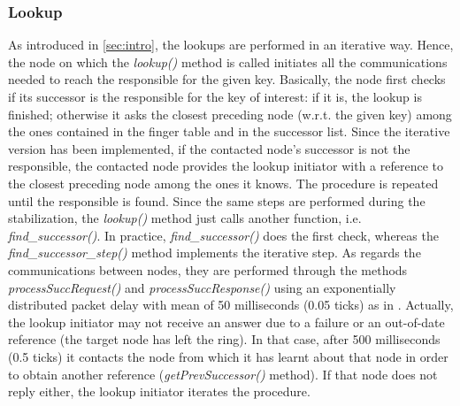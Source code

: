 \documentclass[11pt,twocolumn,letterpaper]{article}
\begin{document}
	\subsubsection{Lookup}
	\label{subsubsec:lookup}
	As introduced in \cref{sec:intro}, the lookups are performed in an iterative way. Hence, the node on which the \textit{lookup()} method is called initiates all the communications needed to reach the responsible for the given key. \newline
	Basically, the node first checks if its successor is the responsible for the key of interest: if it is, the lookup is finished; otherwise it asks the closest preceding node (w.r.t. the given key) among the ones contained in the finger table and in the successor list. Since the iterative version has been implemented, if the contacted node's successor is not the responsible, the contacted node provides the lookup initiator with a reference to the closest preceding node among the ones it knows. The procedure is repeated until the responsible is found. \newline
	Since the same steps are performed during the stabilization, the \textit{lookup()} method just calls another function, i.e. \textit{find\_successor()}. In practice, \textit{find\_successor()} does the first check, whereas the \textit{find\_successor\_step()} method implements the iterative step. As regards the communications between nodes, they are performed through the methods \textit{processSuccRequest()} and \textit{processSuccResponse()} using an exponentially distributed packet delay with mean of 50 milliseconds (0.05 ticks) as in \cite{chord}. \newline
	Actually, the lookup initiator may not receive an answer due to a failure or an out-of-date reference (the target node has left the ring). In that case, after 500 milliseconds (0.5 ticks) it contacts the node from which it has learnt about that node in order to obtain another reference (\textit{getPrevSuccessor()} method). If that node does not reply either, the lookup initiator iterates the procedure.
	
\end{document}
